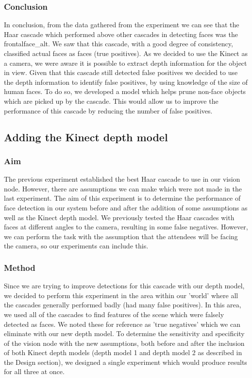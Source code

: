\documentclass[conference]{IEEEtran}
\begin{document}
\subsubsection{Conclusion}
In conclusion, from the data gathered from the experiment we can see that the Haar cascade which performed above other cascades in detecting faces was the frontalface\_alt. We saw that this cascade, with a good degree of consistency, classified actual faces as faces (true positives). As we decided to use the Kinect as a camera, we were aware it is possible to extract depth information for the object in view. Given that this cascade still detected false positives we decided to use the depth information to identify false positives, by using knowledge of the size of human faces. To do so, we developed a model which helps prune non-face objects which are picked up by the cascade. This would allow us to improve the performance of this cascade by reducing the number of false positives.

\subsection{Adding the Kinect depth model}
\subsubsection{Aim}
The previous experiment established the best Haar cascade to use in our vision node. However, there are assumptions we can make which were not made in the last experiment. The aim of this experiment is to determine the performance of face detection in our system before and after the addition of some assumptions as well as the Kinect depth model.
We previously tested the Haar cascades with faces at different angles to the camera, resulting in some false negatives. However, we can perform the task with the assumption that the attendees will be facing the camera, so our experiments can include this.
\subsubsection{Method}
Since we are trying to improve detections for this cascade with our depth model, we decided to perform this experiment in the area within our 'world' where all the cascades generally performed badly (had many false positives). In this area, we used all of the cascades to find features of the scene which were falsely detected as faces. We noted these for reference as 'true negatives' which we can eliminate with our new depth model.
To determine the sensitivity and specificity of the vision node with the new assumptions, both before and after the inclusion of both Kinect depth models (depth model 1 and depth model 2 as described in the Design section), we designed a single experiment which would produce results for all three at once.
\end{document}
